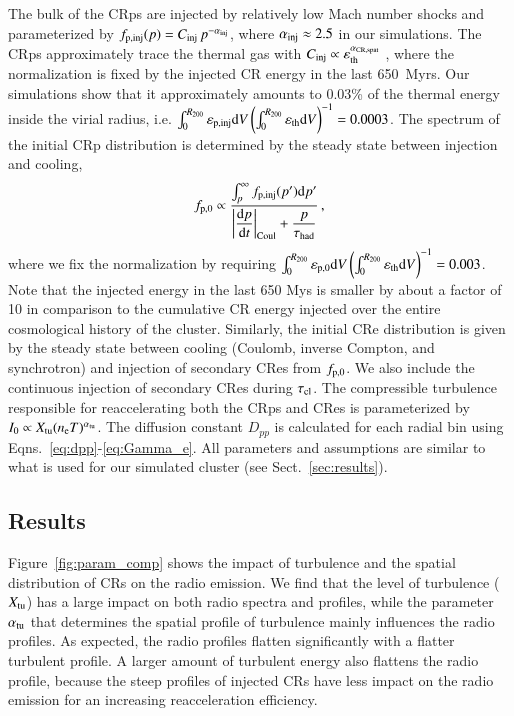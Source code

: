 \documentclass[fleqn,usenatbib,useAMS]{mnras}
\newcommand{\eps}{\varepsilon}
\begin{document}
The bulk of the CRps are injected by relatively low Mach number shocks
and parameterized by $f_{\mathrm{p,inj}}(p) =
C_{\mathrm{inj}}\,p^{-\alpha_{\mathrm{inj}}}$, where $\alpha_{\mathrm{inj}}\approx
2.5$ in our simulations. The CRps approximately trace the thermal gas
with $C_\rmn{inj} \propto \eps_\rmn{th}^{\alpha_\rmn{CR,spat}}$
\citep{pinzke10,2016MNRAS.459...70V}, where the normalization is fixed
by the injected CR energy in the last 650~Myrs. Our simulations show
that it approximately amounts to 0.03\% of the thermal energy inside
the virial radius, i.e.  $\int_0^{R_{200}}\eps_\rmn{p,inj} \rmn{d}
V\left(\int_0^{R_{200}}\eps_\rmn{th} \rmn{d}V\right)^{-1} =
0.0003$. The spectrum of the initial CRp distribution is determined by
the steady state between injection and cooling,
\begin{equation}
 f_{\mathrm{p,0}} \propto \frac{\int_p^\infty f_{\mathrm{p,inj}}(p') 
{\mathrm{d}}p'}{\displaystyle\left|{{{\mathrm{d}}p}\over{{\mathrm{d}}t}}\right|_{\rm Coul}+\frac{p}{\tau_{\rm had}}}\,,
\end{equation}
where we fix the normalization by requiring
$\int_0^{R_{200}}\eps_\rmn{p,0}
\rmn{d}V\left(\int_0^{R_{200}}\eps_\rmn{th} \rmn{d}V\right)^{-1} =
0.003$. Note that the injected energy in the last 650 Mys is smaller
by about a factor of 10 in comparison to the cumulative CR energy
injected over the entire cosmological history of the cluster.
Similarly, the initial CRe distribution is given by the steady state
between cooling (Coulomb, inverse Compton, and synchrotron) and
injection of secondary CRes from $f_{\mathrm{p,0}}$. We also include the
continuous injection of secondary CRes during $\tau_{\mathrm{cl}}$. The
compressible turbulence responsible for reaccelerating both the CRps
and CRes is parameterized by $I_0 \propto X_{\mathrm{tu}} (n_{{\mathrm{e}}}
T)^{\alpha_{\mathrm{tu}}}$. The diffusion constant $D_{pp}$ is calculated
for each radial bin using Eqns.~\ref{eq:dpp}-\ref{eq:Gamma_e}. All
parameters and assumptions are similar to what is used for our
simulated cluster (see Sect.~\ref{sec:results}).


\subsection{Results}

Figure~\ref{fig:param_comp} shows the impact of turbulence and the
spatial distribution of CRs on the radio emission.  We find that the
level of turbulence ($X_{\mathrm{tu}}$) has a large impact on both radio
spectra and profiles, while the parameter $\alpha_{\mathrm{tu}}$ that
determines the spatial profile of turbulence mainly influences the
radio profiles. As expected, the radio profiles flatten significantly
with a flatter turbulent profile. A larger amount of turbulent energy
also flattens the radio profile, because the steep profiles of
injected CRs have less impact on the radio emission for an increasing
reacceleration efficiency.
\end{document}
